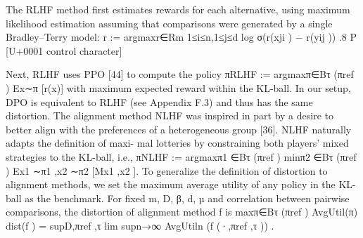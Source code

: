 \documentclass[10pt]{article}
\begin{document}
\begin{ReviewVerbatim}
The RLHF method first estimates rewards for each alternative, using maximum likelihood estimation
assuming that comparisons were generated by a single Bradley–Terry model:
                  r := argmaxr∈Rm 1≤i≤n,1≤j≤d log σ(r(xji ) − r(yij )) .8
                                     P                                     [U+0001 control character]

Next, RLHF uses PPO [44] to compute the policy πRLHF := argmaxπ∈Bτ (πref ) Ex∼π [r(x)] with
maximum expected reward within the KL-ball. In our setup, DPO is equivalent to RLHF (see
Appendix F.3) and thus has the same distortion.
The alignment method NLHF was inspired in part by a desire to better align with the
preferences of a heterogeneous group [36]. NLHF naturally adapts the definition of maxi-
mal lotteries by constraining both players’ mixed strategies to the KL-ball, i.e., πNLHF :=
argmaxπ1 ∈Bτ (πref ) minπ2 ∈Bτ (πref ) Ex1 ∼π1 ,x2 ∼π2 [Mx1 ,x2 ].
To generalize the definition of distortion to alignment methods, we set the maximum average utility of
any policy in the KL-ball as the benchmark. For fixed m, D, β, d, µ and correlation between pairwise
comparisons, the distortion of alignment method f is
                                                             maxπ∈Bτ (πref ) AvgUtil(π)
                      dist(f ) = supD,πref ,τ lim supn→∞       AvgUtiln (f (·,πref ,τ )) .
\end{ReviewVerbatim}
\end{document}
